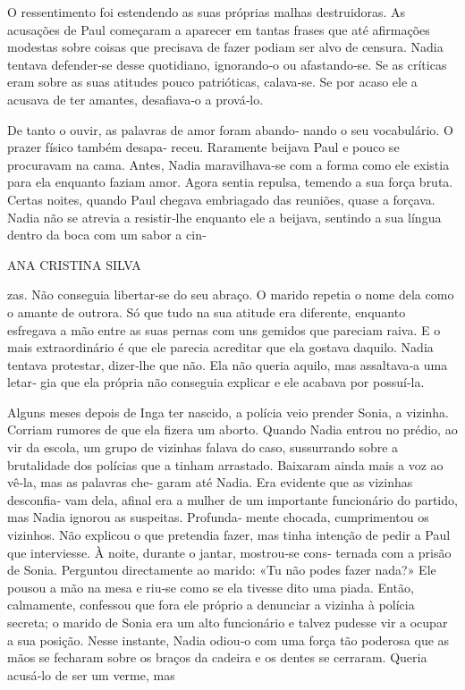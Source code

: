 O ressentimento foi estendendo as suas próprias malhas destruidoras. As
acusações de Paul começaram a aparecer em tantas frases que até
afirmações modestas sobre coisas que precisava de fazer podiam ser alvo
de censura. Nadia tentava defender‑se desse quotidiano, ignorando‑o ou
afastando‑se. Se as críticas eram sobre as suas atitudes pouco
patrióticas, calava‑se. Se por acaso ele a acusava de ter amantes,
desafiava‑o a prová‑lo.

De tanto o ouvir, as palavras de amor foram abando‑ nando o seu
vocabulário. O prazer físico também desapa‑ receu. Raramente beijava
Paul e pouco se procuravam na cama. Antes, Nadia maravilhava‑se com a
forma como ele existia para ela enquanto faziam amor. Agora sentia
repulsa, temendo a sua força bruta. Certas noites, quando Paul chegava
embriagado das reuniões, quase a forçava. Nadia não se atrevia a
resistir‑lhe enquanto ele a beijava, sentindo a sua língua dentro da
boca com um sabor a cin‑

ANA CRISTINA SILVA

zas. Não conseguia libertar‑se do seu abraço. O marido repetia o nome
dela como o amante de outrora. Só que tudo na sua atitude era diferente,
enquanto esfregava a mão entre as suas pernas com uns gemidos que
pareciam raiva. E o mais extraordinário é que ele parecia acreditar que
ela gostava daquilo. Nadia tentava protestar, dizer‑lhe que não. Ela não
queria aquilo, mas assaltava‑a uma letar‑ gia que ela própria não
conseguia explicar e ele acabava por possuí‑la.

Alguns meses depois de Inga ter nascido, a polícia veio prender Sonia, a
vizinha. Corriam rumores de que ela fizera um aborto. Quando Nadia
entrou no prédio, ao vir da escola, um grupo de vizinhas falava do caso,
sussurrando sobre a brutalidade dos polícias que a tinham arrastado.
Baixaram ainda mais a voz ao vê‑la, mas as palavras che‑ garam até
Nadia. Era evidente que as vizinhas desconfia‑ vam dela, afinal era a
mulher de um importante funcionário do partido, mas Nadia ignorou as
suspeitas. Profunda‑ mente chocada, cumprimentou os vizinhos. Não
explicou o que pretendia fazer, mas tinha intenção de pedir a Paul que
interviesse. À noite, durante o jantar, mostrou‑se cons‑ ternada com a
prisão de Sonia. Perguntou directamente ao marido: «Tu não podes fazer
nada?» Ele pousou a mão na mesa e riu‑se como se ela tivesse dito uma
piada. Então, calmamente, confessou que fora ele próprio a denunciar a
vizinha à polícia secreta; o marido de Sonia era um alto funcionário e
talvez pudesse vir a ocupar a sua posição. Nesse instante, Nadia odiou‑o
com uma força tão poderosa que as mãos se fecharam sobre os braços da
cadeira e os dentes se cerraram. Queria acusá‑lo de ser um verme, mas

